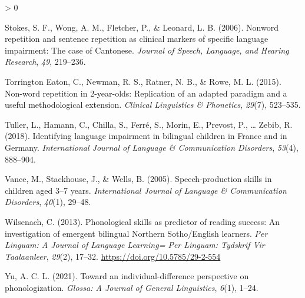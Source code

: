 \documentclass[
  american,
  ,man,floatsintext]{apa6}
\newlength{\cslhangindent}
\newenvironment{CSLReferences}[2] %
 {%
  \setlength{\parindent}{0pt}
  \ifodd #1 \everypar{\setlength{\hangindent}{\cslhangindent}}\ignorespaces\fi
  \ifnum #2 > 0
  \setlength{\parskip}{#2\baselineskip}
  \fi
 }%
 {}
\begin{document}
\begin{CSLReferences}{1}{0}
\leavevmode\hypertarget{ref-stokes2006nonword}{}%
Stokes, S. F., Wong, A. M., Fletcher, P., \& Leonard, L. B. (2006). Nonword repetition and sentence repetition as clinical markers of specific language impairment: The case of {C}antonese. \emph{Journal of Speech, Language, and Hearing Research}, \emph{49}, 219--236.

\leavevmode\hypertarget{ref-torrington2015non}{}%
Torrington Eaton, C., Newman, R. S., Ratner, N. B., \& Rowe, M. L. (2015). Non-word repetition in 2-year-olds: Replication of an adapted paradigm and a useful methodological extension. \emph{Clinical Linguistics \& Phonetics}, \emph{29}(7), 523--535.

\leavevmode\hypertarget{ref-tuller2018identifying}{}%
Tuller, L., Hamann, C., Chilla, S., Ferré, S., Morin, E., Prevost, P., \ldots{} Zebib, R. (2018). Identifying language impairment in bilingual children in {France and in Germany}. \emph{International Journal of Language \& Communication Disorders}, \emph{53}(4), 888--904.

\leavevmode\hypertarget{ref-vance2005speech}{}%
Vance, M., Stackhouse, J., \& Wells, B. (2005). Speech-production skills in children aged 3--7 years. \emph{International Journal of Language \& Communication Disorders}, \emph{40}(1), 29--48.

\leavevmode\hypertarget{ref-wilsenach2013phonological}{}%
Wilsenach, C. (2013). {Phonological skills as predictor of reading success: An investigation of emergent bilingual Northern Sotho/English learners}. \emph{{Per Linguam: A Journal of Language Learning= Per Linguam: Tydskrif Vir Taalaanleer}}, \emph{29}(2), 17--32. \url{https://doi.org/10.5785/29-2-554}

\leavevmode\hypertarget{ref-yu2021toward}{}%
Yu, A. C. L. (2021). Toward an individual-difference perspective on phonologization. \emph{Glossa: A Journal of General Linguistics}, \emph{6}(1), 1--24.

\end{CSLReferences}
\end{document}
